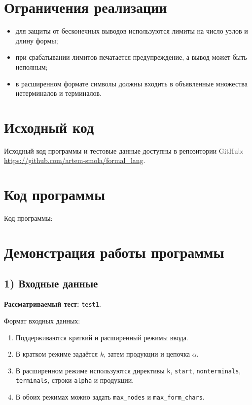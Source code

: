 \documentclass[12pt,a4paper]{article}
\begin{document}
\section{Ограничения реализации}
\begin{itemize}
    \item для защиты от бесконечных выводов используются лимиты на число узлов и длину формы;
    \item при срабатывании лимитов печатается предупреждение, а вывод может быть неполным;
    \item в расширенном формате символы должны входить в объявленные множества нетерминалов и терминалов.
\end{itemize}

\section{Исходный код}
Исходный код программы и тестовые данные доступны в репозитории GitHub:
\url{https://github.com/artem-smola/formal_lang}.

\section{Код программы}

Код программы:

{\small
{}
}

\section{Демонстрация работы программы}
\subsection*{1) Входные данные}
\textbf{Рассматриваемый тест:} \texttt{test1}.

Формат входных данных:
\begin{enumerate}
    \item Поддерживаются краткий и расширенный режимы ввода.
    \item В кратком режиме задаётся $k$, затем продукции и цепочка $\alpha$.
    \item В расширенном режиме используются директивы \texttt{k}, \texttt{start},
    \texttt{nonterminals}, \texttt{terminals}, строки \texttt{alpha} и продукции.
    \item В обоих режимах можно задать \texttt{max\_nodes} и \texttt{max\_form\_chars}.
\end{enumerate}
\end{document}
